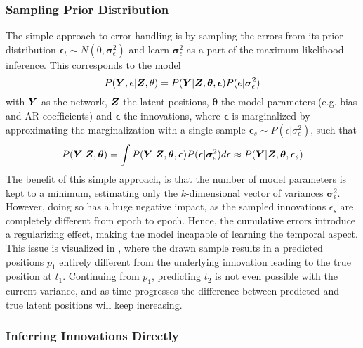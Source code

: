     \subsubsection{Sampling Prior Distribution}
    
        The simple approach to error handling is by sampling the errors from its prior distribution $\bm{\epsilon}_t \sim N(0,\bm{\sigma}_\epsilon^2)$ and learn $\bm{\sigma}_\epsilon^2$ as a part of the maximum likelihood inference.
        This corresponds to the model
        \begin{equation}
            P(\bm{Y},\bm{\epsilon}|\bm{Z},\theta) = P(\bm{Y}|\bm{Z},\bm{\theta},\bm{\epsilon})P(\bm{\epsilon}|\bm{\sigma}_\epsilon^2)
        \end{equation}
        with $\bm{Y}$ as the network, $\bm{Z}$ the latent positions, $\bm{\theta}$ the model parameters (e.g. bias and AR-coefficients) and $\bm{\epsilon}$ the innovations, where $\bm{\epsilon}$ is marginalized by approximating the marginalization with a single sample $\bm{\epsilon}_s \sim P(\epsilon|\sigma_\epsilon^2)$, such that
        \begin{equation}
            P(\bm{Y}|\bm{Z},\bm{\theta}) = \int P(\bm{Y}|\bm{Z},\bm{\theta},\bm{\epsilon}) P(\bm{\epsilon}|\bm{\sigma}_\epsilon^2) d\bm{\epsilon} \approx P(\bm{Y}|\bm{Z},\bm{\theta},\bm{\epsilon}_s)
        \end{equation}
        The benefit of this simple approach, is that the number of model parameters is kept to a minimum, estimating only the $k$-dimensional vector of variances $\bm{\sigma}_\epsilon^2$. However, doing so has a huge negative impact, as the sampled innovations $\epsilon_s$ are completely different from epoch to epoch. Hence, the cumulative errors introduce a regularizing effect, making the model incapable of learning the temporal aspect. This issue is visualized in , where the drawn sample results in a predicted positions $p_1$ entirely different from the underlying innovation leading to the true position at $t_1$. 
        Continuing from $p_1$, predicting $t_2$ is not even possible with the current variance, and as time progresses the difference between predicted and true latent positions will keep increasing.
    
    \subsubsection{Inferring Innovations Directly}

